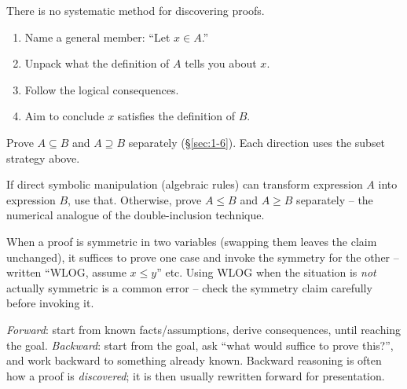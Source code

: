 \begin{note}
There is no systematic method for discovering proofs.
\end{note}

\begin{note}
\begin{enumerate}[label=\arabic*.]
    \item Name a general member: ``Let $x \in A$.''
    \item Unpack what the definition of $A$ tells you about $x$.
    \item Follow the logical consequences.
    \item Aim to conclude $x$ satisfies the definition of $B$.
\end{enumerate}
\end{note}

\begin{note}[Strategy: proving $A = B$ (sets)]
Prove $A \subseteq B$ and $A \supseteq B$ separately (\S\ref{sec:1-6}). Each direction uses the subset strategy above.
\end{note}

\begin{note}[Strategy: proving $A = B$ (numbers)]
If direct symbolic manipulation (algebraic rules) can transform expression $A$ into expression $B$, use that. Otherwise, prove $A \le B$ and $A \ge B$ separately -- the numerical analogue of the double-inclusion technique.
\end{note}

\begin{note}
When a proof is symmetric in two variables (swapping them leaves the claim unchanged), it suffices to prove one case and invoke the symmetry for the other -- written ``WLOG, assume $x\le y$'' etc. Using WLOG when the situation is \emph{not} actually symmetric is a common error -- check the symmetry claim carefully before invoking it.
\end{note}

\begin{note}
\emph{Forward}: start from known facts/assumptions, derive consequences, until reaching the goal. \emph{Backward}: start from the goal, ask ``what would suffice to prove this?'', and work backward to something already known. Backward reasoning is often how a proof is \emph{discovered}; it is then usually rewritten forward for presentation.
\end{note}

